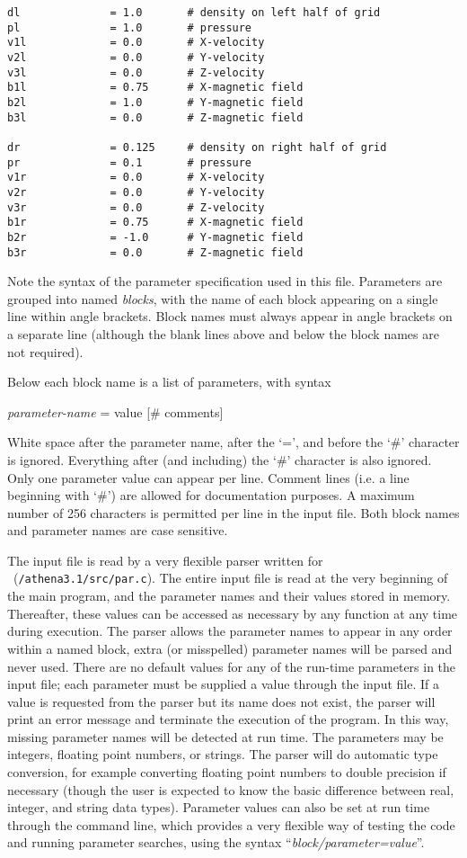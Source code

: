 \begin{verbatim}
dl              = 1.0       # density on left half of grid
pl              = 1.0       # pressure
v1l             = 0.0       # X-velocity
v2l             = 0.0       # Y-velocity
v3l             = 0.0       # Z-velocity
b1l             = 0.75      # X-magnetic field
b2l             = 1.0       # Y-magnetic field
b3l             = 0.0       # Z-magnetic field

dr              = 0.125     # density on right half of grid
pr              = 0.1       # pressure
v1r             = 0.0       # X-velocity
v2r             = 0.0       # Y-velocity
v3r             = 0.0       # Z-velocity
b1r             = 0.75      # X-magnetic field
b2r             = -1.0      # Y-magnetic field
b3r             = 0.0       # Z-magnetic field
\end{verbatim}
\normalsize

Note the syntax of the parameter specification used in this file.
Parameters are grouped into named {\it blocks}, with the name of each
block appearing on a single line within angle brackets.  Block names
must always appear in angle brackets on a separate line (although the
blank lines above and below the block names are not required).

Below each block name is a list of parameters, with syntax
\begin{center}
 {\it parameter-name} = value [\# comments]
\end{center}
White space after the parameter name, after the `=', and before the
`\#' character is ignored.  Everything after (and including) the `\#'
character is also ignored.  Only one parameter value can appear per
line.  Comment lines (i.e. a line beginning with `\#') are allowed for
documentation purposes.  A maximum number of 256 characters is permitted
per line in the input file.  Both block names and parameter names are
case sensitive.

The input file is read by a very flexible parser written for \ath\
({\tt /athena3.1/src/par.c}).  The entire input file is read at the
very beginning of the main program, and the parameter names and their
values stored in memory.  Thereafter, these values can be accessed as
necessary by any function at any time during execution.  The parser
allows the parameter names to appear in any order within a named
block, extra (or misspelled) parameter names will be parsed and never
used.  There are no default values for any of the run-time parameters
in the input file; each parameter must be supplied a value through the
input file.  If a value is requested from the parser but its name does
not exist, the parser will print an error message and terminate the
execution of the program.  In this way, missing
parameter names will be detected at run time.  The parameters may be
integers, floating point numbers, or strings.  The parser will do
automatic type conversion, for example converting floating point
numbers to double precision if necessary (though the user is expected
to know the basic difference between real, integer, and string data
types).  Parameter values can also be set at run time through the
command line, which provides a very flexible way of testing the code
and running parameter searches,
using the syntax ``{\it block/parameter=value}''.

